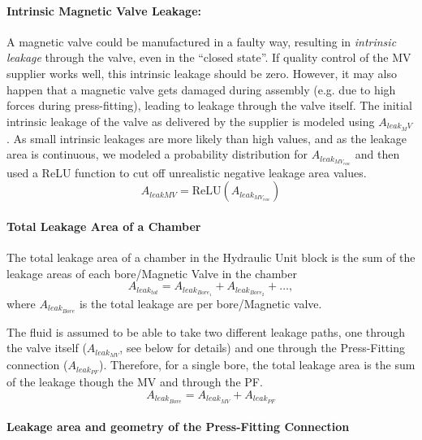 \paragraph{Intrinsic Magnetic Valve Leakage:}
A magnetic valve could be manufactured in a faulty way, resulting in \textit{intrinsic leakage} through the valve, even in the “closed state”. If quality control of the MV supplier works well, this intrinsic leakage should be zero. 
However, it may also happen that a magnetic valve gets damaged during assembly (e.g. due to high forces during press-fitting), leading to leakage through the valve itself. 
The initial intrinsic leakage of the valve as delivered by the supplier is modeled using $A_{leak_MV}$. As small intrinsic leakages are more likely than high values, and as the leakage area is continuous, we modeled a probability distribution for $A_{leak_{MV_{raw}}}$ and then used a ReLU function to cut off unrealistic negative leakage area values. 
\begin{equation}
    A_{leakMV} = \text{ReLU}(A_{leak_{MV_{raw}}})
\end{equation}

\paragraph{Total Leakage Area of a Chamber}
The total leakage area of a chamber in the Hydraulic Unit block is the sum of the leakage areas of each bore/Magnetic Valve in the chamber
\begin{equation}
    A_{leak_{tot}} = A_{leak_{Bore_1}} + A_{leak_{Bore_2}} + …,
\end{equation}
where $A_{leak_{Bore}}$ is the total leakage are per bore/Magnetic valve.

The fluid is assumed to be able to take two different leakage paths, one through the valve itself ($A_{leak_{MV}}$, see below for details) and one through the Press-Fitting connection ($A_{leak_{PF}}$).  Therefore, for a single bore, the total leakage area is the sum of the leakage though the MV and through the PF.
\begin{equation}
    A_{leak_{Bore}} = A_{leak_{MV}} + A_{leak_{PF}}
\end{equation}

\paragraph{Leakage area and geometry of the Press-Fitting Connection}

